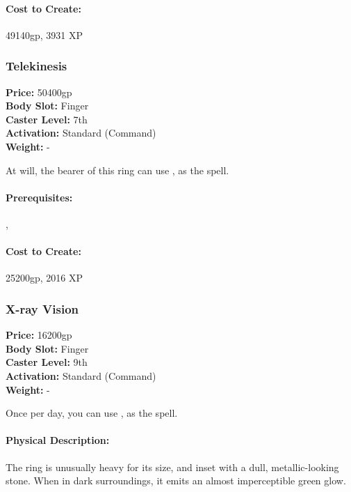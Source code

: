 \paragraph{Cost to Create:} 49140gp, 3931 XP
\subsubsection{Telekinesis}
\label{Item:Telekinesis}
   \textbf{Price:} 50400gp
\\ \textbf{Body Slot:} Finger
\\ \textbf{Caster Level:} 7th
\\ \textbf{Activation:} Standard (Command)
\\ \textbf{Weight:} -

At will, the bearer of this ring can use , as the spell.


\paragraph{Prerequisites:} , 

\paragraph{Cost to Create:} 25200gp, 2016 XP
\subsubsection{X-ray Vision}
\label{Item:XRayVision}
   \textbf{Price:} 16200gp
\\ \textbf{Body Slot:} Finger
\\ \textbf{Caster Level:} 9th
\\ \textbf{Activation:} Standard (Command)
\\ \textbf{Weight:} -

Once per day, you can use , as the spell.

\paragraph{Physical Description:} The ring is unusually heavy for its size, and inset with a dull, metallic-looking stone. When in dark surroundings, it emits an almost imperceptible green glow.

